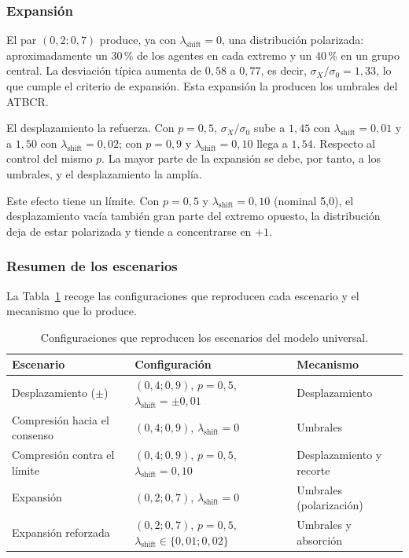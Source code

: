 \documentclass[11pt,a4paper]{article}
\begin{document}
\subsubsection{Expansión}
\label{sec:shift-esc-expansion}

El par $(0{,}2;0{,}7)$ produce, ya con $\lambda_{\mathrm{shift}}=0$, una distribución polarizada: aproximadamente un 30\,\% de los agentes en cada extremo y un 40\,\% en un grupo central. La desviación típica aumenta de $0{,}58$ a $0{,}77$, es decir, $\sigma_X/\sigma_0=1{,}33$, lo que cumple el criterio de expansión. Esta expansión la producen los umbrales del ATBCR.

El desplazamiento la refuerza. Con $p=0{,}5$, $\sigma_X/\sigma_0$ sube a $1{,}45$ con $\lambda_{\mathrm{shift}}=0{,}01$ y a $1{,}50$ con $\lambda_{\mathrm{shift}}=0{,}02$; con $p=0{,}9$ y $\lambda_{\mathrm{shift}}=0{,}10$ llega a $1{,}54$. Respecto al control del mismo $p$. La mayor parte de la expansión se debe, por tanto, a los umbrales, y el desplazamiento la amplía.

Este efecto tiene un límite. Con $p=0{,}5$ y $\lambda_{\mathrm{shift}}=0{,}10$ (nominal 5,0), el desplazamiento vacía también gran parte del extremo opuesto, la distribución deja de estar polarizada y tiende a concentrarse en $+1$.

\subsubsection{Resumen de los escenarios}
\label{sec:shift-esc-resumen}

La Tabla~\ref{tab:shift-esc-resumen} recoge las configuraciones que reproducen cada escenario y el mecanismo que lo produce.

\begin{table}[htbp]
\centering
\caption{Configuraciones que reproducen los escenarios del modelo universal.}
\label{tab:shift-esc-resumen}
\small
\begin{tabular}{lll}
\toprule
Escenario & Configuración & Mecanismo \\
\midrule
Desplazamiento ($\pm$) & $(0{,}4;0{,}9)$, $p=0{,}5$, $\lambda_{\mathrm{shift}}=\pm0{,}01$ & Desplazamiento \\
Compresión hacia el consenso & $(0{,}4;0{,}9)$, $\lambda_{\mathrm{shift}}=0$ & Umbrales \\
Compresión contra el límite & $(0{,}4;0{,}9)$, $p=0{,}5$, $\lambda_{\mathrm{shift}}=0{,}10$ & Desplazamiento y recorte \\
Expansión & $(0{,}2;0{,}7)$, $\lambda_{\mathrm{shift}}=0$ & Umbrales (polarización) \\
Expansión reforzada & $(0{,}2;0{,}7)$, $p=0{,}5$, $\lambda_{\mathrm{shift}}\in\{0{,}01;0{,}02\}$ & Umbrales y absorción \\
\bottomrule
\end{tabular}
\end{table}
\end{document}
